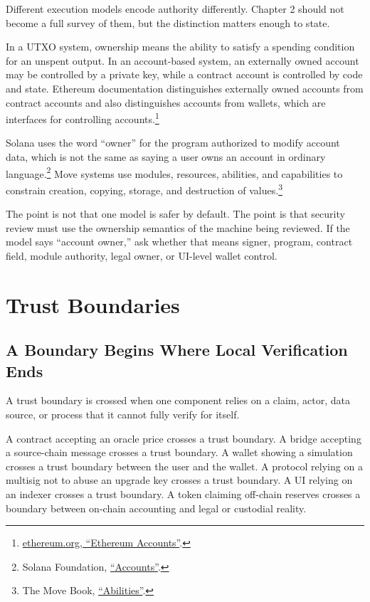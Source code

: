 Different execution models encode authority differently. Chapter 2 should not become a full survey of them, but the distinction matters enough to state.

In a UTXO system, ownership means the ability to satisfy a spending condition for an unspent output. In an account-based system, an externally owned account may be controlled by a private key, while a contract account is controlled by code and state. Ethereum documentation distinguishes externally owned accounts from contract accounts and also distinguishes accounts from wallets, which are interfaces for controlling accounts.\footnote{\href{https://ethereum.org/developers/docs/accounts/}{ethereum.org, ``Ethereum Accounts''}.}

Solana uses the word ``owner'' for the program authorized to modify account data, which is not the same as saying a user owns an account in ordinary language.\footnote{Solana Foundation, \href{https://solana.com/docs/core/accounts}{``Accounts''}.} Move systems use modules, resources, abilities, and capabilities to constrain creation, copying, storage, and destruction of values.\footnote{The Move Book, \href{https://move-book.com/reference/abilities/}{``Abilities''}.}

The point is not that one model is safer by default. The point is that security review must use the ownership semantics of the machine being reviewed. If the model says ``account owner,'' ask whether that means signer, program, contract field, module authority, legal owner, or UI-level wallet control.

\section{Trust Boundaries}

\subsection{A Boundary Begins Where Local Verification Ends}

A trust boundary is crossed when one component relies on a claim, actor, data source, or process that it cannot fully verify for itself.

A contract accepting an oracle price crosses a trust boundary. A bridge accepting a source-chain message crosses a trust boundary. A wallet showing a simulation crosses a trust boundary between the user and the wallet. A protocol relying on a multisig not to abuse an upgrade key crosses a trust boundary. A UI relying on an indexer crosses a trust boundary. A token claiming off-chain reserves crosses a boundary between on-chain accounting and legal or custodial reality.

